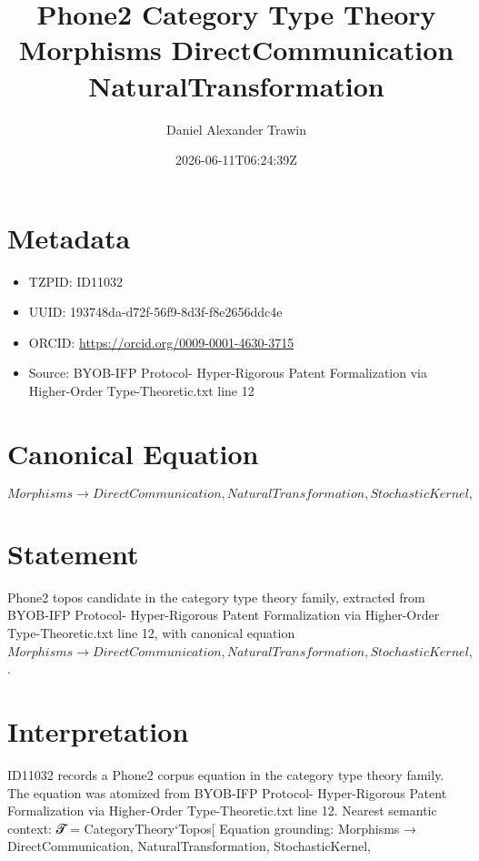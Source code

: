 \documentclass[11pt]{article}
\title{Phone2 Category Type Theory Morphisms DirectCommunication NaturalTransformation}
\author{Daniel Alexander Trawin}
\date{2026-06-11T06:24:39Z}
\begin{document}
\maketitle
\section*{Metadata}
\begin{itemize}
\item TZPID: ID11032
\item UUID: 193748da-d72f-56f9-8d3f-f8e2656ddc4e
\item ORCID: \url{https://orcid.org/0009-0001-4630-3715}
\item Source: BYOB-IFP Protocol- Hyper-Rigorous Patent Formalization via Higher-Order Type-Theoretic.txt line 12
\end{itemize}
\section*{Canonical Equation}
\[
Morphisms → {DirectCommunication, NaturalTransformation, StochasticKernel},
\]
\section*{Statement}
Phone2 topos candidate in the category type theory family, extracted from BYOB-IFP Protocol- Hyper-Rigorous Patent Formalization via Higher-Order Type-Theoretic.txt line 12, with canonical equation $Morphisms → {DirectCommunication, NaturalTransformation, StochasticKernel},$.
\section*{Interpretation}
ID11032 records a Phone2 corpus equation in the category type theory family. The equation was atomized from BYOB-IFP Protocol- Hyper-Rigorous Patent Formalization via Higher-Order Type-Theoretic.txt line 12. Nearest semantic context: 𝓣 = CategoryTheory`Topos[ Equation grounding: Morphisms → {DirectCommunication, NaturalTransformation, StochasticKernel},
\end{document}
